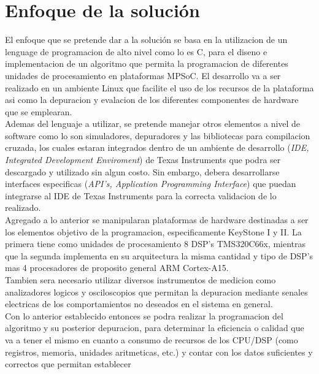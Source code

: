\chapter{Enfoque de la solución}
\label{ch:Enfoque_de_la_solucion}

El enfoque que se pretende dar a la solución se basa en la utilizacion de un lenguage de programacion
de alto nivel como lo es C, para el diseno e implementacion de un algoritmo que permita la programacion
de diferentes unidades de procesamiento en plataformas MPSoC. El desarrollo va a ser realizado en un ambiente
Linux que facilite el uso de los recursos de la plataforma asi como la depuracion y evalacion de los diferentes
componentes de hardware que se emplearan.\\

Ademas del lenguaje a utilizar, se pretende manejar otros elementos a nivel de software como lo son simuladores, 
depuradores y las bibliotecas para compilacion cruzada, los cuales estaran integrados dentro de un ambiente de 
desarrollo (\textit{IDE, Integrated Development Enviroment}) de Texas Instruments que podra ser descargado y 
utilizado sin algun costo. Sin embargo, debera desarrollarse interfaces especificas 
(\textit{API's, Application Programming Interface}) que puedan integrarse al IDE de Texas Instruments para 
la correcta validacion de lo realizado.\\

Agregado a lo anterior se manipularan plataformas de hardware destinadas a ser los elementos objetivo de la
programacion, especificamente KeyStone I y II. La primera tiene como unidades de procesamiento 8 DSP's 
TMS320C66x, mientras que la segunda implementa en su arquitectura la misma cantidad y tipo de DSP's
mas 4 procesadores de proposito general ARM Cortex-A15.\\

Tambien sera necesario utilizar diversos instrumentos de medicion como analizadores logicos y osciloscopios
que permitan la depuracion mediante senales electricas de los comportamientos no deseados en el sistema en general.\\

Con lo anterior establecido entonces se podra realizar la programacion del algoritmo y su posterior depuracion, para
determinar la eficiencia o calidad que va a tener el mismo en cuanto a consumo de recursos de los CPU/DSP (como registros,
memoria, unidades aritmeticas, etc.) y contar con los datos suficientes y correctos que permitan establecer